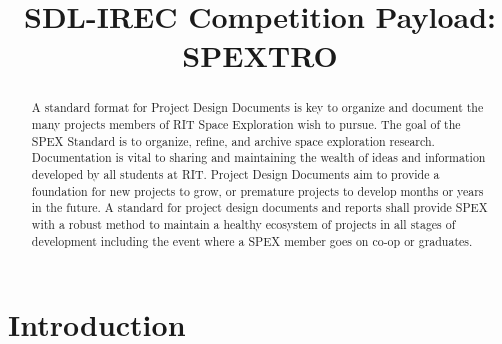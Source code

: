 \documentclass[conference]{IEEEtran} %
\title{SDL-IREC Competition Payload: SPEXTRO}
\author{
  \IEEEauthorblockN{%
    James~Parkus\IEEEauthorrefmark{1},  %
  }
  \IEEEauthorblockA{%
    RIT Space Exploration, Rochester Institute of Technology \\ %
    Rochester, N.Y. \\
    Email:
    \IEEEauthorrefmark{1}jep7631@rit.edu
  }

}
\begin{document}
\maketitle%

\begin{abstract}
  A standard format for Project Design Documents is key to organize and document the many projects members of RIT Space Exploration wish to pursue.
  The goal of the SPEX Standard is to organize, refine, and archive space exploration research.
  Documentation is vital to sharing and maintaining the wealth of ideas and information developed by all students at RIT.\@
  Project Design Documents aim to provide a foundation for new projects to grow, or premature projects to develop months or years in the future.
  A standard for project design documents and reports shall provide SPEX with a robust method to maintain a healthy ecosystem of projects in all stages of development including the event where a SPEX member goes on co-op or graduates.

\end{abstract}

\section{Introduction}
\label{sec:introduction}
\end{document}
